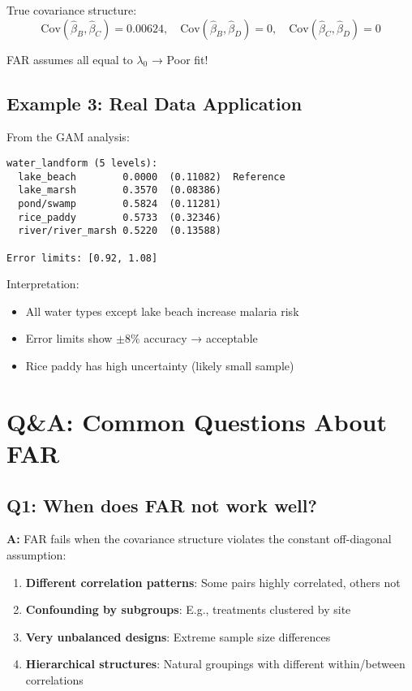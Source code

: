 \documentclass[11pt]{article}
\begin{document}
True covariance structure:
\begin{equation}
    \text{Cov}(\hat{\beta}_B, \hat{\beta}_C) = 0.00624, \quad
    \text{Cov}(\hat{\beta}_B, \hat{\beta}_D) = 0, \quad
    \text{Cov}(\hat{\beta}_C, \hat{\beta}_D) = 0
\end{equation}

FAR assumes all equal to $\lambda_0$ → Poor fit!

\subsection{Example 3: Real Data Application}

From the GAM analysis:
\begin{verbatim}
water_landform (5 levels):
  lake_beach        0.0000  (0.11082)  Reference
  lake_marsh        0.3570  (0.08386)  
  pond/swamp        0.5824  (0.11281)  
  rice_paddy        0.5733  (0.32346)  
  river/river_marsh 0.5220  (0.13588)  
  
Error limits: [0.92, 1.08]
\end{verbatim}

Interpretation:
\begin{itemize}
    \item All water types except lake beach increase malaria risk
    \item Error limits show $\pm 8\%$ accuracy → acceptable
    \item Rice paddy has high uncertainty (likely small sample)
\end{itemize}

\section{Q\&A: Common Questions About FAR}

\subsection{Q1: When does FAR not work well?}

\textbf{A:} FAR fails when the covariance structure violates the constant off-diagonal assumption:

\begin{enumerate}
    \item \textbf{Different correlation patterns}: Some pairs highly correlated, others not
    \item \textbf{Confounding by subgroups}: E.g., treatments clustered by site
    \item \textbf{Very unbalanced designs}: Extreme sample size differences
    \item \textbf{Hierarchical structures}: Natural groupings with different within/between correlations
\end{enumerate}
\end{document}
